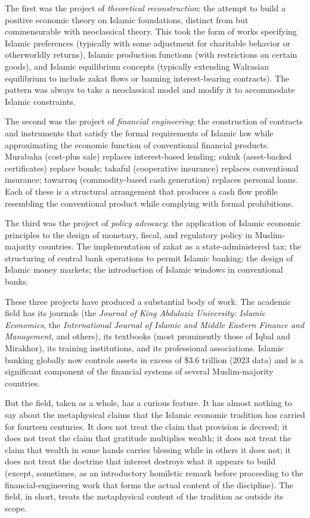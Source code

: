 The first was the project of \emph{theoretical reconstruction}: the
attempt to build a positive economic theory on Islamic foundations,
distinct from but commensurable with neoclassical theory. This took
the form of works specifying Islamic preferences (typically with
some adjustment for charitable behavior or otherworldly returns),
Islamic production functions (with restrictions on certain goods),
and Islamic equilibrium concepts (typically extending Walrasian
equilibrium to include zakat flows or banning interest-bearing
contracts). The pattern was always to take a neoclassical model and
modify it to accommodate Islamic constraints.

The second was the project of \emph{financial engineering}: the
construction of contracts and instruments that satisfy the formal
requirements of Islamic law while approximating the economic
function of conventional financial products. Murabaha (cost-plus
sale) replaces interest-based lending; sukuk (asset-backed
certificates) replace bonds; takaful (cooperative insurance)
replaces conventional insurance; tawarruq (commodity-based cash
generation) replaces personal loans. Each of these is a structural
arrangement that produces a cash flow profile resembling the
conventional product while complying with formal prohibitions.

The third was the project of \emph{policy advocacy}: the application
of Islamic economic principles to the design of monetary, fiscal, and
regulatory policy in Muslim-majority countries. The implementation of
zakat as a state-administered tax; the structuring of central bank
operations to permit Islamic banking; the design of Islamic money
markets; the introduction of Islamic windows in conventional banks.

These three projects have produced a substantial body of work. The
academic field has its journals (the \emph{Journal of King Abdulaziz
University: Islamic Economics}, the \emph{International Journal of
Islamic and Middle Eastern Finance and Management}, and others), its
textbooks (most prominently those of Iqbal and Mirakhor), its
training institutions, and its professional associations. Islamic
banking globally now controls assets in excess of \$3.6 trillion
(2023 data) and is a significant component of the financial systems
of several Muslim-majority countries.

But the field, taken as a whole, has a curious feature. It has
almost nothing to say about the metaphysical claims that the Islamic
economic tradition has carried for fourteen centuries. It does not
treat the claim that provision is decreed; it does not treat the
claim that gratitude multiplies wealth; it does not treat the claim
that wealth in some hands carries blessing while in others it does
not; it does not treat the doctrine that interest destroys what it
appears to build (except, sometimes, as an introductory homiletic
remark before proceeding to the financial-engineering work that
forms the actual content of the discipline). The field, in short,
treats the metaphysical content of the tradition as outside its
scope.

